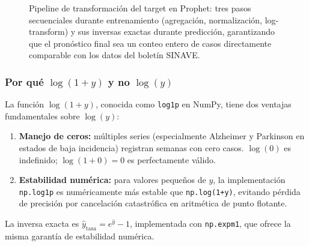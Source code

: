 \documentclass[12pt, letterpaper]{article}
\begin{document}
\begin{figure}[H]
{%
}%
\caption[Pipeline de transformación log(1+y).]{Pipeline de transformación del target en Prophet: tres pasos secuenciales durante entrenamiento (agregación, normalización, log-transform) y sus inversas exactas durante predicción, garantizando que el pronóstico final sea un conteo entero de casos directamente comparable con los datos del boletín SINAVE.}
\label{fig:log_pipeline}
\end{figure}

\subsubsection*{Por qué $\log(1+y)$ y no $\log(y)$}

La función $\log(1+y)$, conocida como \texttt{log1p} en NumPy, tiene dos ventajas fundamentales sobre $\log(y)$:

\begin{enumerate}
  \item \textbf{Manejo de ceros:} múltiples series (especialmente Alzheimer y Parkinson en estados de baja incidencia) registran semanas con cero casos. $\log(0)$ es indefinido; $\log(1+0) = 0$ es perfectamente válido.
  \item \textbf{Estabilidad numérica:} para valores pequeños de $y$, la implementación \texttt{np.log1p} es numéricamente más estable que \texttt{np.log(1+y)}, evitando pérdida de precisión por cancelación catastrófica en aritmética de punto flotante.
\end{enumerate}

La inversa exacta es $\hat{y}_{\text{tasa}} = e^{\hat{y}} - 1$, implementada con \texttt{np.expm1}, que ofrece la misma garantía de estabilidad numérica.
\end{document}
